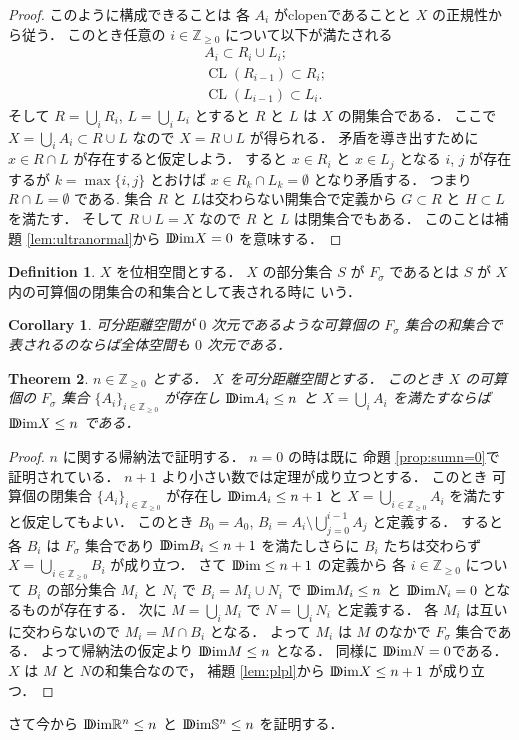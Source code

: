 \documentclass[leqno, a4paper, 12pt]{jsarticle}
\theoremstyle{plain}
\newtheorem{thm}{Theorem}[section]
\newtheorem{cor}[thm]{Corollary}
\theoremstyle{definition}
\newtheorem{df}{Definition}[section]
\theoremstyle{remark}
\newcommand{\zz}{\mathbb{Z}}
\newcommand{\rr}{\mathbb{R}}
\DeclareMathOperator{\cl}{\mathrm{CL}}
\newcommand{\yoddim}{\mathrm{D\hspace{-5.5pt}Dim}}
\newcommand{\yospfont}[1]{\mathbb{#1}}
\newcommand{\yosphere}[1]{\yospfont{S}^{#1}}
\numberwithin{equation}{section}
\begin{document}
\begin{proof}
このように構成できることは
各
$A_{i}$
がclopenであることと
$X$
の正規性から従う．
このとき任意の
$i\in \zz_{\ge 0}$
について以下が満たされる
\begin{align}
&A_{i}\subset R_{i}\cup L_{i};\\
&\cl(R_{i-1})\subset R_{i};\\
&\cl(L_{i-1})\subset L_{i}. 
\end{align}
そして
$R=\bigcup_{i}R_{i}$, 
$L=\bigcup_{i}L_{i}$
とすると
$R$
と
$L$
は
$X$
の開集合である．
ここで
$X=\bigcup_{i}A_{i}\subset R\cup L$
なので
$X=R\cup L$
が得られる．
矛盾を導き出すために
$x\in R\cap L$
が存在すると仮定しよう．
すると
$x\in R_{i}$
と
$x\in L_{j}$
となる
$i$, 
$j$
が存在するが
$k=\max\{i, j\}$
とおけば
$x\in R_{k}\cap L_{k}=\emptyset$
となり矛盾する．
つまり
$R\cap L=\emptyset$
である. 
集合
$R$
と
$L$は交わらない開集合で定義から
$G\subset R$
と
$H\subset L$
を満たす．
そして
$R\cup L=X$
なので
$R$
と
$L$
は閉集合でもある．
このことは補題 
\ref{lem:ultranormal}から
$\yoddim X=0$
を意味する．
\end{proof}


\begin{df}
$X$
を位相空間とする．
$X$
の部分集合
$S$
が
$F_{\sigma}$
であるとは
$S$
が
$X$
内の可算個の閉集合の和集合として表される時に
いう．
\end{df}

\begin{cor}\label{cor:sum:0dimFsigma}
可分距離空間が
$0$
次元であるような可算個の
$F_{\sigma}$
集合の和集合で表されるのならば全体空間も
$0$
次元である．
\end{cor}


\begin{thm}\label{thm:sum:sumsum}
$n\in \zz_{\ge 0}$
とする．
$X$
を可分距離空間とする．
このとき
$X$
の可算個の
$F_{\sigma}$
集合
$\{A_{i}\}_{i\in \zz_{\ge 0}}$
が存在し
$\yoddim A_{i}\le n$
と
$X=\bigcup_{i}A_{i}$
を満たすならば
$\yoddim X\le n$
である．
\end{thm}
\begin{proof}
$n$
に関する帰納法で証明する．
$n=0$
の時は既に
命題
\ref{prop:sumn=0}で
証明されている．
$n+1$
より小さい数では定理が成り立つとする．
このとき
可算個の閉集合
$\{A_{i}\}_{i\in \zz_{\ge 0}}$
が存在し
$\yoddim A_{i}\le n+1$
と
$X=\bigcup_{i\in \zz_{\ge 0}}A_{i}$
を満たすと仮定してもよい．
このとき
$B_{0}=A_{0}$, 
$B_{i}=A_{i}\setminus \bigcup_{j=0}^{i-1}A_{j}$
と定義する．
すると各
$B_{i}$
は
$F_{\sigma}$
集合であり
$\yoddim B_{i}\le n+1$
を満たしさらに
$B_{i}$
たちは交わらず
$X=\bigcup_{i\in \zz_{\ge 0}}B_{i}$
が成り立つ．
さて
$\yoddim\le n+1$
の定義から
各
$i\in \zz_{\ge 0}$
について
$B_{i}$
の部分集合
$M_{i}$
と
$N_{i}$
で
$B_{i}=M_{i}\cup N_{i}$
で
$\yoddim M_{i}\le n$
と
$\yoddim N_{i}=0$
となるものが存在する．
次に
$M=\bigcup_{i}M_{i}$
で
$N=\bigcup_{i}N_{i}$
と定義する．
各
$M_{i}$
は互いに交わらないので
$M_{i}=M\cap B_{i}$
となる．
よって
$M_{i}$
は
$M$
のなかで
$F_{\sigma}$
集合である．
よって帰納法の仮定より
$\yoddim M\le n$
となる．
同様に
$\yoddim N=0$である．
$X$
は
$M$
と
$N$の和集合なので，
補題 \ref{lem:plpl}から
$\yoddim X\le n+1$
が成り立つ．
\end{proof}
さて今から
$\yoddim\rr^{n}\le n$
と
$\yoddim\yosphere{n}\le n$
を証明する．
\end{document}
